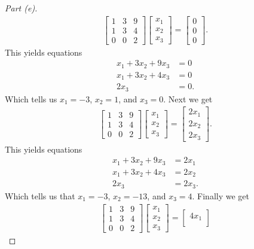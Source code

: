\documentclass[leqno]{article}
\theoremstyle{nonumberplain}
\newtheorem{proof}{Proof}
\begin{document}
\begin{proof}[Part (e)]
\begin{align*}
\begin{bmatrix}
1 & 3 & 9\\
1 & 3 & 4\\
0 & 0 & 2
\end{bmatrix}
\begin{bmatrix}
x_1\\
x_2\\
x_3
\end{bmatrix}=
\begin{bmatrix}
0\\
0\\
0
\end{bmatrix}.
\end{align*}
This yields equations
\begin{align*}
x_1+3x_2+9x_3&=0\\
x_1+3x_2+4x_3&=0\\
2x_3&=0.
\end{align*}
Which tells us $x_1=-3$, $x_2=1$, and $x_3=0$.  Next we get
\begin{align*}
\begin{bmatrix}
1 & 3 & 9\\
1 & 3 & 4\\
0 & 0 & 2
\end{bmatrix}
\begin{bmatrix}
x_1\\
x_2\\
x_3
\end{bmatrix}=
\begin{bmatrix}
2x_1\\
2x_2\\
2x_3
\end{bmatrix}.
\end{align*}
This yields equations
\begin{align*}
x_1+3x_2+9x_3&=2x_1\\
x_1+3x_2+4x_3&=2x_2\\
2x_3&=2x_3.
\end{align*}
Which tells us that $x_1=-3$, $x_2=-13$, and $x_3=4$. Finally we get
\begin{align*}
\begin{bmatrix}
1 & 3 & 9\\
1 & 3 & 4\\
0 & 0 & 2
\end{bmatrix}
\begin{bmatrix}
x_1\\
x_2\\
x_3
\end{bmatrix}=
\begin{bmatrix}
4x_1\\

\end{bmatrix}
\end{align*}
\end{proof}
\end{document}
